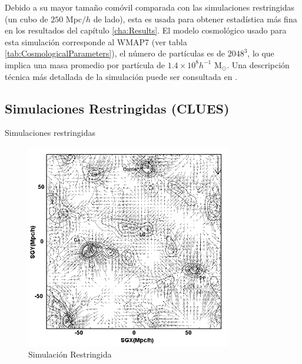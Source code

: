 Debido a su mayor tamaño comóvil comparada con las simulaciones 
restringidas (un cubo de $250$ Mpc$/h$ de lado), esta es usada para 
obtener estadística más fina en los resultados del capítulo 
\ref{cha:Results}. El modelo cosmológico usado para esta simulación 
corresponde al WMAP7 (ver tabla \ref{tab:CosmologicalParameters}), el número 
de partículas es de $2048^3$, lo que implica una masa promedio por partícula 
de $1.4 \times 10^8 h^{-1}$ M$_{\odot}$. Una descripción técnica más 
detallada de la simulación puede ser consultada en \cite{klypin2011}.


	\subsection{Simulaciones Restringidas (CLUES)}
	\label{subsec:ConstrainedSimulations}


Simulaciones restringidas

\begin{figure}[htbp]
	\centering
	\includegraphics[width=0.8\textwidth]
	{./figures/3_nbody_simulations/Constrained_Construction.png}

	\caption{\small{Simulación Restringida}}
	
	\label{fig:Constrained_Construction}
\end{figure}
\newpage


